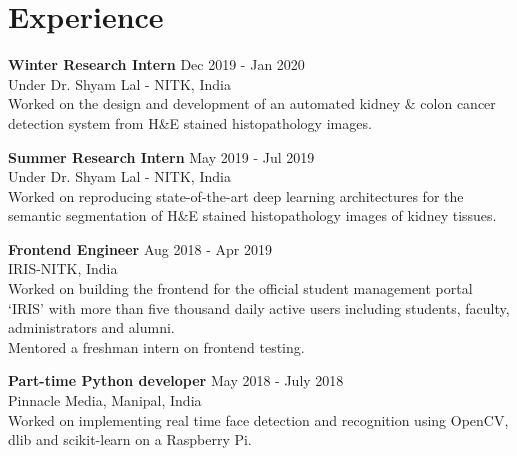 \documentclass[letterpaper]{article}
\renewenvironment{itemize}{
  \begin{list}{}{
    \setlength{\leftmargin}{1.5em}
  }
}{
  \end{list}
}
\newcommand{\smallGreyFont}[1]{\textcolor{black!80}{\small{#1}}}
\begin{document}
\section*{Experience}
  \begin{itemize}
    \item \textbf{Winter Research Intern}
    \hfill{\textcolor{black!80}{\small{Dec 2019 - Jan 2020}}}\\
    \smallGreyFont{Under Dr. Shyam Lal - NITK, India}\\
      Worked on the design and development of an automated kidney \& colon cancer detection system from H\&E stained histopathology images.

    \item \textbf{Summer Research Intern}
    \hfill{\textcolor{black!80}{\small{May 2019 - Jul 2019}}}\\
    \smallGreyFont{Under Dr. Shyam Lal - NITK, India}\\
      Worked on reproducing state-of-the-art deep learning architectures for the semantic segmentation of H\&E stained histopathology images of kidney tissues.

    \item \textbf{Frontend Engineer}
    \hfill{\textcolor{black!80}{\small{Aug 2018 - Apr 2019}}}\\
    \smallGreyFont{IRIS-NITK, India}\\
      Worked on building the frontend for the official student management portal `IRIS' with more than five thousand daily active users including students, faculty, administrators and alumni.\\
      Mentored a freshman intern on frontend testing.

    \item \textbf{Part-time Python developer}
    \hfill{\textcolor{black!80}{\small{May 2018 - July 2018}}}\\
    \smallGreyFont{Pinnacle Media, Manipal, India}\\
      Worked on implementing real time face detection and recognition using OpenCV, dlib and scikit-learn on a Raspberry Pi.
  \end{itemize}

\end{document}
